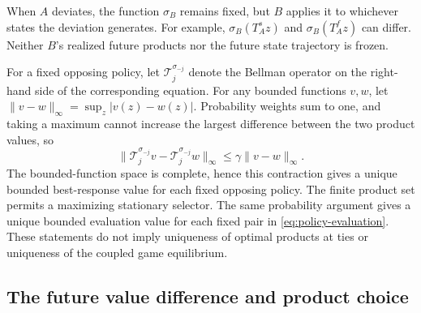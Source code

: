 \documentclass[11pt]{article}
\begin{document}
When $A$ deviates, the function $\sigma_B$ remains fixed, but $B$ applies
it to whichever states the deviation generates. For example,
$\sigma_B(T_A^s z)$ and $\sigma_B(T_A^f z)$ can differ. Neither $B$'s
realized future products nor the future state trajectory is frozen.

For a fixed opposing policy, let $\mathcal T_j^{\sigma_{-j}}$ denote
the Bellman operator on the right-hand side of the corresponding
equation. For any bounded functions $v,w$, let
$\|v-w\|_\infty=\sup_z|v(z)-w(z)|$. Probability weights sum to one,
and taking a maximum cannot increase the largest difference between
the two product values, so
\begin{equation}\label{eq:contraction}
\|\mathcal T_j^{\sigma_{-j}}v-\mathcal T_j^{\sigma_{-j}}w\|_\infty
\leq\gamma\|v-w\|_\infty.
\end{equation}
The bounded-function space is complete, hence this contraction gives
a unique bounded best-response value for each fixed opposing policy.
The finite product set permits a maximizing stationary selector.
The same probability argument gives a unique bounded evaluation value
for each fixed pair in \eqref{eq:policy-evaluation}. These statements
do not imply uniqueness of optimal products at ties or uniqueness of
the coupled game equilibrium.

\subsection{The future value difference and product choice}
\end{document}
